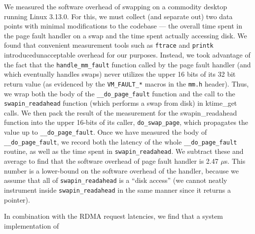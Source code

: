 We measured the software overhead of swapping on a commodity desktop running
Linux 3.13.0. For this, we must collect (and separate out) two data points with
minimal modifications to the codebase --- the overall time spent in the page
fault handler on a swap and the time spent actually accessing disk. We found that 
convenient measurement tools such as \texttt{ftrace} and \texttt{printk} 
introducedunacceptable overhead for our purposes. 
Instead, we took advantage of the fact that the
\texttt{handle\_mm\_fault} function called by the page fault handler (and which
eventually handles swaps) never utilizes the upper 16 bits of its 32 bit return
value (as evidenced by the \texttt{VM\_FAULT\_*} macros in the \texttt{mm.h}
header). Thus, we wrap both the body of the \texttt{\_\_do\_page\_fault} function and the
call to the \texttt{swapin\_readahead} function (which performs a swap from
disk) in ktime\_get calls.  We then pack the result of the measurement for the
swapin\_readahead function into the upper 16-bits of its caller,
\texttt{do\_swap\_page}, which propagates the value up to
\texttt{\_\_do\_page\_fault}. 
Once we have measured the body of
\texttt{\_\_do\_page\_fault}, we record both the latency of the whole
\texttt{\_\_do\_page\_fault} routine, as well as the time spent in
\texttt{swapin\_readahead}. We subtract these and average to find that the
software overhead of page fault handler is 2.47 $\mu$s. This
number is a lower-bound on the software overhead of the handler, because we
assume that all of \texttt{swapin\_readahead} is a ``disk access'' (we cannot neatly instrument inside \texttt{swapin\_readahead} in the same manner since it returns a pointer).

In combination with the RDMA request latencies, we find that a system implementation  
of 


